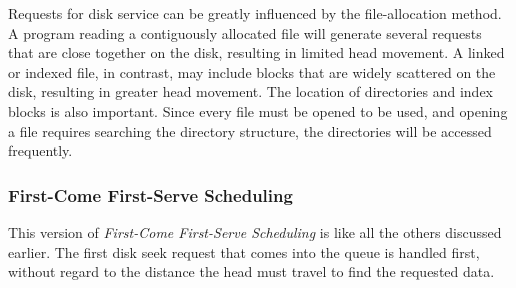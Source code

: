 Requests for disk service can be greatly influenced by the file-allocation method.
A program reading a contiguously allocated file will generate several requests that are close together on the disk, resulting in limited head movement.
A linked or indexed file, in contrast, may include blocks that are widely scattered on the disk, resulting in greater head movement.
The location of directories and index blocks is also important.
Since every file must be opened to be used, and opening a file requires searching the directory structure, the directories will be accessed frequently.

\subsubsection{First-Come First-Serve Scheduling}\label{subsubsec:FCFS_Disk_Scheduling}
This version of \emph{First-Come First-Serve Scheduling} is like all the others discussed earlier.
The first disk seek request that comes into the queue is handled first, without regard to the distance the head must travel to find the requested data.


